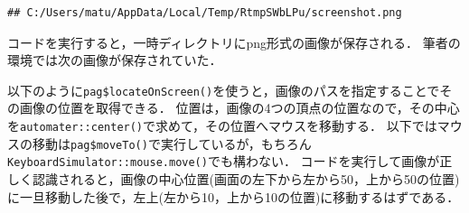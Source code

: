 \documentclass[
]{article}
\newenvironment{Shaded}{\begin{snugshade}}{\end{snugshade}}
\newcommand{\AttributeTok}[1]{\textcolor[rgb]{0.77,0.63,0.00}{#1}}
\newcommand{\CommentTok}[1]{\textcolor[rgb]{0.56,0.35,0.01}{\textit{#1}}}
\newcommand{\DecValTok}[1]{\textcolor[rgb]{0.00,0.00,0.81}{#1}}
\newcommand{\FunctionTok}[1]{\textcolor[rgb]{0.00,0.00,0.00}{#1}}
\newcommand{\NormalTok}[1]{#1}
\newcommand{\OtherTok}[1]{\textcolor[rgb]{0.56,0.35,0.01}{#1}}
\newcommand{\SpecialCharTok}[1]{\textcolor[rgb]{0.00,0.00,0.00}{#1}}
\newcommand{\StringTok}[1]{\textcolor[rgb]{0.31,0.60,0.02}{#1}}
\begin{document}
\begin{Shaded}
\end{Shaded}

\begin{verbatim}
## C:/Users/matu/AppData/Local/Temp/RtmpSWbLPu/screenshot.png
\end{verbatim}

コードを実行すると，一時ディレクトリにpng形式の画像が保存される．
筆者の環境では次の画像が保存されていた．

以下のように\texttt{pag\$locateOnScreen()}を使うと，画像のパスを指定することでその画像の位置を取得できる．
位置は，画像の4つの頂点の位置なので，その中心を\texttt{automater::center()}で求めて，その位置へマウスを移動する．
以下ではマウスの移動は\texttt{pag\$moveTo()}で実行しているが，もちろん\texttt{KeyboardSimulator::mouse.move()}でも構わない．
コードを実行して画像が正しく認識されると，画像の中心位置(画面の左下から左から50，上から50の位置)に一旦移動した後で，左上(左から10，上から10の位置)に移動するはずである．

\begin{Shaded}
\end{Shaded}
\end{document}
